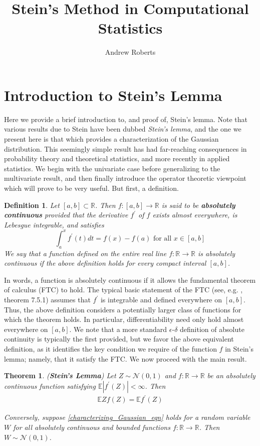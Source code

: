 \documentclass[12pt]{article}
\title{Stein's Method in Computational Statistics}
\author{Andrew Roberts}
\newcommand*{\abs}[1]{\left\lvert#1\right\rvert}
\newcommand{\R}{\mathbb{R}}
\newcommand{\E}{\mathbb{E}}
\newcommand{\Gaussian}{\mathcal{N}}
\newtheorem{definition}{Definition}
\newtheorem{thm}{Theorem}
\begin{document}
\maketitle
\tableofcontents
\newpage

\section{Introduction to Stein's Lemma}
Here we provide a brief introduction to, and proof of, Stein's lemma. Note that various results due to Stein have been dubbed \textit{Stein's lemma}, and the one we present here is that which provides a 
characterization of the Gaussian distribution. This seemingly simple result has had far-reaching consequences in probability theory and theoretical statistics, and more recently in applied statistics. We begin 
with the univariate case before generalizing to the multivariate result, and then finally introduce the operator theoretic viewpoint which will prove to be very useful. But first, a definition. 

\begin{definition}
Let $[a, b] \subset \R$. Then $f: [a, b] \to \R$ is said to be \textbf{absolutely continuous} provided that the derivative $f^\prime$ of $f$ exists almost everywhere, is Lebesgue integrable, and satisfies 
\[
\int_{a}^{x} f^\prime(t) dt = f(x) - f(a) \text{ for all } x \in [a, b]
\]
We say that a function defined on the entire real line $f: \R \to \R$ is absolutely continuous if the above definition holds for every compact interval $[a, b]$. 
\end{definition}
In words, a function is absolutely continuous if it allows the fundamental theorem of calculus (FTC) to hold. The typical basic statement of the FTC
(see, e.g. \cite{Abbott}, theorem 7.5.1) assumes that $f^\prime$ is integrable and defined everywhere on $[a, b]$. Thus, the above definition considers a potentially larger class of functions 
for which the theorem holds. In particular, differentiability need only hold almost everywhere on $[a, b]$. We note that a more standard $\epsilon$-$\delta$ definition of absolute continuity is 
typically the first provided, but we favor the above equivalent definition, as it identifies the key condition we require of the function $f$ in Stein's lemma; namely, that it satisfy the FTC. 
We now proceed with the main result. 

\begin{thm} 
(\textbf{Stein's Lemma}) Let $Z \sim \Gaussian(0, 1)$ and $f: \R \to \R$ be an absolutely continuous function satisfying $\E\abs{f^\prime(Z)} < \infty$. Then 
\begin{align}
\E Z f(Z) = \E f^\prime(Z) \label{characterizing_Gaussian_eqn}
\end{align}

Conversely, suppose \ref{characterizing_Gaussian_eqn} holds for a random variable $W$ for all absolutely continuous and bounded functions $f: \R \to \R$. 
Then $W \sim \Gaussian(0, 1)$. 
\end{thm}
\end{document}
